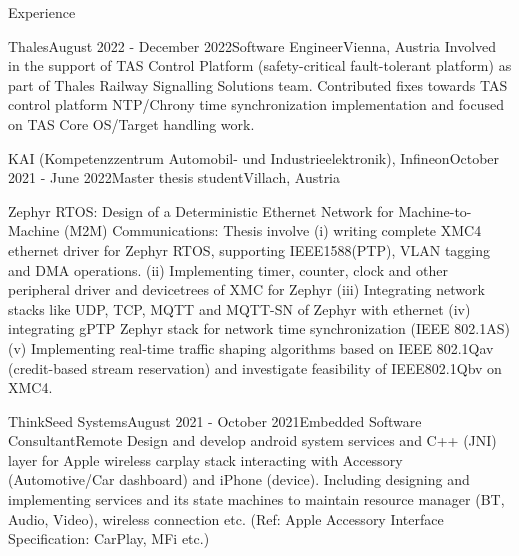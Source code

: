 \documentclass[
	a4paper, %
	11pt, %
]{resume} %
\begin{document}

\begin{rSection}{Experience}

    \begin{rSubsection}{Thales}{August 2022 - December 2022}{Software Engineer}{Vienna, Austria}
        Involved in the support of TAS Control Platform (safety-critical fault-tolerant platform) as part 
        of Thales Railway Signalling Solutions team. Contributed fixes towards TAS control platform NTP/Chrony time 
        synchronization implementation and focused on TAS Core OS/Target handling work.
		
    \end{rSubsection}

	\begin{rSubsection}{KAI (Kompetenzzentrum Automobil- und Industrieelektronik), Infineon}{October 2021 - June 2022}{Master thesis student}{Villach, Austria}

            {\color{orange} Zephyr RTOS: Design of a Deterministic Ethernet Network for Machine-to-Machine (M2M) Communications}: Thesis involve (i) writing complete XMC4 ethernet driver for Zephyr RTOS, supporting IEEE1588(PTP), VLAN tagging and DMA operations. (ii) Implementing timer, counter, clock and other peripheral driver and devicetrees of XMC for Zephyr (iii) Integrating network stacks like UDP, TCP, MQTT and MQTT-SN of Zephyr with ethernet (iv) integrating gPTP Zephyr stack for network time synchronization (IEEE 802.1AS) (v) Implementing real-time traffic shaping algorithms based on IEEE 802.1Qav (credit-based stream reservation) and investigate feasibility of IEEE802.1Qbv on XMC4.
		
	\end{rSubsection}


	\begin{rSubsection}{ThinkSeed Systems}{August 2021 - October 2021}{Embedded Software Consultant}{Remote}
            Design and develop android system services and C++ (JNI) layer for Apple wireless carplay stack interacting with Accessory (Automotive/Car dashboard) and iPhone (device). Including designing and implementing services and its state machines to maintain resource manager (BT, Audio, Video), wireless connection etc. (Ref: Apple Accessory Interface Specification: CarPlay, MFi etc.)


\end{rSubsection}
\end{rSection}
\end{document}
